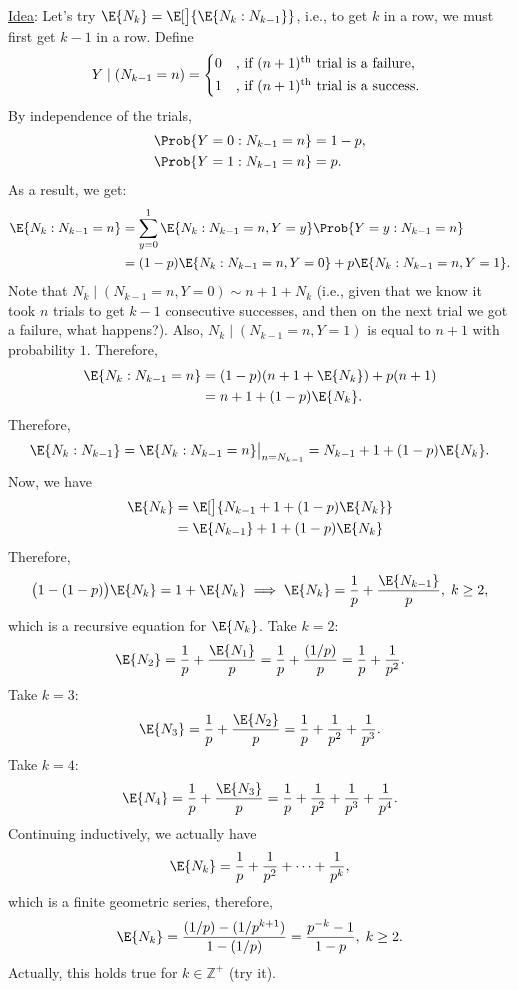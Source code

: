 \begin{Example}
    \underline{Idea}: Let's try $ \E{N_k}=\E[\big]{\E{N_k\given N_{k-1}}} $, i.e., to get $ k $ in a row,
    we must first get $ k-1 $ in a row. Define
    \[ Y\mid(N_{k-1}=n)=\begin{cases*}
            0 & , if $ (n+1)\textsuperscript{th} $ trial is a failure, \\
            1 & , if $ (n+1)\textsuperscript{th} $ trial is a success.
        \end{cases*} \]
    By independence of the trials,
    \begin{align*}
        \Prob{Y=0\given N_{k-1}=n} & =1-p, \\
        \Prob{Y=1\given N_{k-1}=n} & =p.
    \end{align*}
    As a result, we get:
    \begin{align*}
        \E{N_k\given N_{k-1}=n}
         & =\sum_{y=0}^1 \E{N_k\given N_{k-1}=n,Y=y}\Prob{Y=y\given N_{k-1}=n} \\
         & =(1-p)\E{N_k\given N_{k-1}=n,Y=0} + p\E{N_k\given N_{k-1}=n,Y=1}.
    \end{align*}
    Note that $ N_k\mid (N_{k-1}=n,Y=0) \sim n+1+N_k $ (i.e., given that we know it took $ n $ trials to get
    $ k-1 $ consecutive successes, and then on the next trial we got a failure, what happens?). Also,
    $ N_k\mid(N_{k-1}=n,Y=1) $ is equal to $ n+1 $ with probability $ 1 $. Therefore,
    \begin{align*}
        \E{N_k\given N_{k-1}=n}
         & =(1-p)(n+1+\E{N_k})+p(n+1) \\
         & =n+1+(1-p)\E{N_k}.
    \end{align*}
    Therefore, \[ \E{N_k\given N_{k-1}}=\E{N_k\given N_{k-1}=n}\big\rvert_{n=N_{k-1}}=N_{k-1}+1+(1-p)\E{N_k}. \]
    Now, we have
    \begin{align*}
        \E{N_k}
         & =\E[\big]{N_{k-1}+1+(1-p)\E{N_k}} \\
         & =\E{N_{k-1}}+1+(1-p)\E{N_k}
    \end{align*}
    Therefore,
    \[ \bigl(1-(1-p)\bigr)\E{N_k}=1+\E{N_k}\implies\E{N_k}=\frac{1}{p} +\frac{\E{N_{k-1}}}{p},\;k\ge 2, \]
    which is a recursive equation for $ \E{N_k} $. Take $ k=2 $:
    \[ \E{N_2}=\frac{1}{p} +\frac{\E{N_1}}{p}=\frac{1}{p} +\frac{(1/p)}{p}=\frac{1}{p} +\frac{1}{p^2}.  \]
    Take $ k=3 $:
    \[ \E{N_3}=\frac{1}{p} +\frac{\E{N_2}}{p}=\frac{1}{p}+\frac{1}{p^2} +\frac{1}{p^3}. \]
    Take $ k=4 $:
    \[ \E{N_4}=\frac{1}{p}+\frac{\E{N_3}}{p}=\frac{1}{p}+\frac{1}{p^2} +\frac{1}{p^3}+\frac{1}{p^4}. \]
    Continuing inductively, we actually have
    \[ \E{N_k}=\frac{1}{p} +\frac{1}{p^2}+\cdots+\frac{1}{p^k}, \]
    which is a finite geometric series, therefore,
    \[ \E{N_k}=\frac{(1/p)-(1/p^{k+1})}{1-(1/p)}=\frac{p^{-k}-1}{1-p},\;k\ge 2. \]
    Actually, this holds true for $ k\in\mathbb{Z}^+ $ (try it).
\end{Example}
